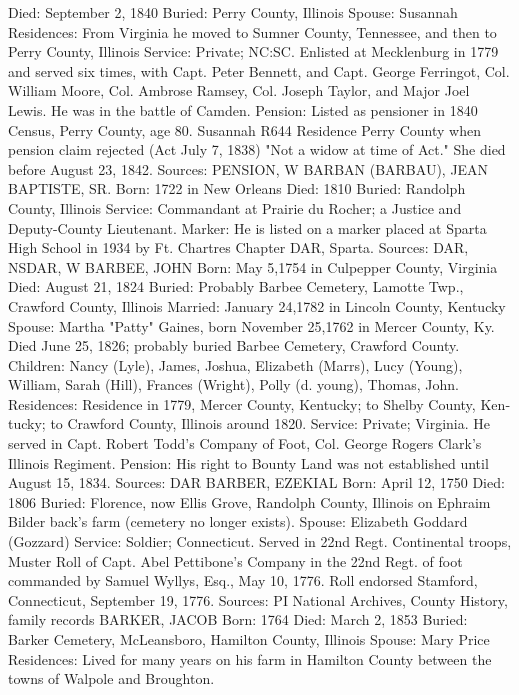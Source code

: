 Died: September 2, 1840 
Buried: Perry County, Illinois 
Spouse: Susannah
Residences: From Virginia he moved to Sumner County, Tennessee, and then to Perry County, Illinois Service: Private; NC:SC. Enlisted at Mecklenburg in 1779 and served six times, with Capt. Peter Bennett, and Capt. George Ferringot, Col. William Moore, Col. Ambrose Ramsey, Col. Joseph Taylor, and Major Joel Lewis. He was in the battle of Camden. 
Pension: Listed as pensioner in 1840 Census, Perry County, age 80. Susannah R644 Residence Perry County when pension claim rejected (Act July 7, 1838) "Not a widow at time of Act." She died before August 23, 1842. 
Sources: PENSION, W 
BARBAN (BARBAU), JEAN BAPTISTE, SR. 
Born: 1722 in New Orleans 
Died: 1810 
Buried: Randolph County, Illinois 
Service: Commandant at Prairie du Rocher; a Justice and Deputy-County Lieu­tenant. 
Marker: He is listed on a marker placed at Sparta High School in 1934 by Ft. Chartres Chapter DAR, Sparta. 
Sources: DAR, NSDAR, W 
BARBEE, JOHN 
Born: May 5,1754 in Culpepper County, Virginia 
Died: August 21, 1824 
Buried: Probably Barbee Cemetery, Lamotte Twp., Crawford County, Illinois 
Married: January 24,1782 in Lincoln County, Kentucky 
Spouse: Martha "Patty" Gaines, born November 25,1762 in Mercer County, Ky. Died June 25, 1826; probably buried Barbee Cemetery, Crawford County. 
Children: Nancy (Lyle), James, Joshua, Elizabeth (Marrs), Lucy (Young), William, 
Sarah (Hill), Frances (Wright), Polly (d. young), Thomas, John. 
Residences: Residence in 1779, Mercer County, Kentucky; to Shelby County, Ken­tucky; to Crawford County, Illinois around 1820. 
Service: Private; Virginia. He served in Capt. Robert Todd's Company of Foot, Col. George Rogers Clark's Illinois Regiment. 
Pension: His right to Bounty Land was not established until August 15, 1834. 
Sources: DAR 
BARBER, EZEKIAL 
Born: April 12, 1750 
Died: 1806 
Buried: Florence, now Ellis Grove, Randolph County, Illinois on Ephraim Bilder­ back's farm (cemetery no longer exists). 
Spouse: Elizabeth Goddard (Gozzard) 
Service: Soldier; Connecticut. Served in 22nd Regt. Continental troops, Muster Roll of Capt. Abel Pettibone's Company in the 22nd Regt. of foot commanded by Samuel Wyllys, Esq., May 10, 1776. Roll endorsed Stamford, Connecticut, September 19, 1776. 
Sources: PI National Archives, County History, family records 
BARKER, JACOB 
Born: 1764 
Died: March 2, 1853 
Buried: Barker Cemetery, McLeansboro, Hamilton County, Illinois 
Spouse: Mary Price 
Residences: Lived for many years on his farm in Hamilton County between the towns of Walpole and Broughton. 
